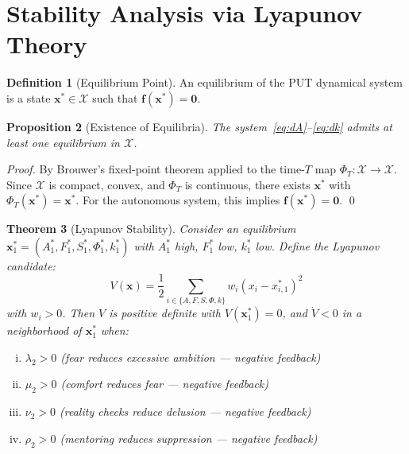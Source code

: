 \documentclass[12pt,a4paper]{article}
\theoremstyle{plain}
\newtheorem{theorem}{Theorem}[section]
\newtheorem{proposition}[theorem]{Proposition}
\theoremstyle{definition}
\newtheorem{definition}[theorem]{Definition}
\theoremstyle{remark}
\newcommand{\X}{\mathcal{X}}
\newcommand{\xstar}{\mathbf{x}^*}
\begin{document}
\section{Stability Analysis via Lyapunov Theory}

\begin{definition}[Equilibrium Point]
An equilibrium of the PUT dynamical system is a state $\xstar \in \X$ such that $\mathbf{f}(\xstar) = \mathbf{0}$.
\end{definition}

\begin{proposition}[Existence of Equilibria]\label{prop:equilibria}
The system~\eqref{eq:dA}--\eqref{eq:dk} admits at least one equilibrium in $\X$.
\end{proposition}

\begin{proof}
By Brouwer's fixed-point theorem applied to the time-$T$ map $\Phi_T: \X \to \X$. Since $\X$ is compact, convex, and $\Phi_T$ is continuous, there exists $\xstar$ with $\Phi_T(\xstar) = \xstar$. For the autonomous system, this implies $\mathbf{f}(\xstar) = \mathbf{0}$. \qed
\end{proof}

\begin{theorem}[Lyapunov Stability]\label{thm:lyapunov}
Consider an equilibrium $\mathbf{x}_1^* = (A_1^*, F_1^*, S_1^*, \Phi_1^*, k_1^*)$ with $A_1^*$ high, $F_1^*$ low, $k_1^*$ low. Define the Lyapunov candidate:
\begin{equation}\label{eq:lyapunov}
V(\mathbf{x}) = \frac{1}{2}\sum_{i \in \{A,F,S,\Phi,k\}} w_i(x_i - x_{i,1}^*)^2
\end{equation}
with $w_i > 0$. Then $V$ is positive definite with $V(\mathbf{x}_1^*) = 0$, and $\dot{V} < 0$ in a neighborhood of $\mathbf{x}_1^*$ when:
\begin{enumerate}[(i),nosep]
  \item $\lambda_2 > 0$ (fear reduces excessive ambition --- negative feedback)
  \item $\mu_2 > 0$ (comfort reduces fear --- negative feedback)
  \item $\nu_2 > 0$ (reality checks reduce delusion --- negative feedback)
  \item $\rho_2 > 0$ (mentoring reduces suppression --- negative feedback)
\end{enumerate}
\end{theorem}
\end{document}
